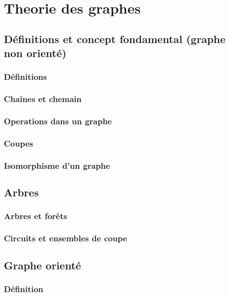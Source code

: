 \chapter{Theorie des graphes}
\section{Définitions et concept fondamental (graphe non orienté)}
\subsection{Définitions}

\subsection{Chaînes et chemain}

\subsection{Operations dans un graphe}

\subsection{Coupes}

\subsection{Isomorphisme d'un graphe}


\section{Arbres}
\subsection{Arbres et forêts}

\subsection{Circuits et ensembles de coupe}

\section{Graphe orienté}
\subsection{Définition}

